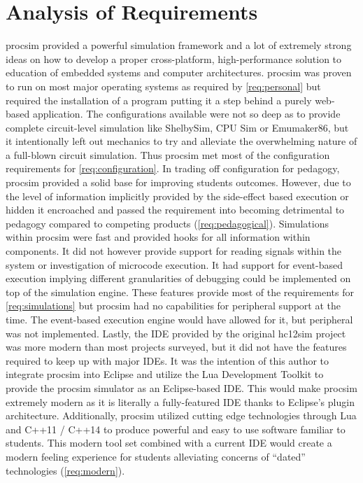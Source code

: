 \section{Analysis of Requirements}

procsim provided a powerful simulation framework and a lot of extremely strong ideas on how to develop a proper cross-platform, high-performance solution to education of embedded systems and computer architectures. procsim  was proven to run on most major operating systems as required by \cref{req:personal} but required the installation of a program putting it a step behind a purely web-based application. The configurations available were not so deep as to provide complete circuit-level simulation like ShelbySim, CPU Sim or Emumaker86, but it intentionally left out mechanics to try and alleviate the overwhelming nature of a full-blown circuit simulation. Thus procsim met most of the configuration requirements for \cref{req:configuration}. In trading off configuration for pedagogy, procsim provided a solid base for improving students outcomes. However, due to the level of information implicitly provided by the side-effect based execution or hidden it encroached and passed the requirement into becoming detrimental to pedagogy compared to competing products (\cref{req:pedagogical}). Simulations within procsim were fast and provided hooks for all information within components. It did not however provide support for reading signals within the system or investigation of microcode execution. It had support for event-based execution implying different granularities of debugging could be implemented on top of the simulation engine. These features provide most of the requirements for \cref{req:simulations} but procsim had no capabilities for peripheral support at the time. The event-based execution engine would have allowed for it, but peripheral was not implemented. Lastly, the IDE provided by the original hc12sim project was more modern than most projects surveyed, but it did not have the features required to keep up with major IDEs. It was the intention of this author to integrate procsim into Eclipse and utilize the Lua Development Toolkit to provide the procsim simulator as an Eclipse-based IDE. This would make procsim extremely modern as it is literally a fully-featured IDE thanks to Eclipse's plugin architecture. Additionally, procsim utilized cutting edge technologies through Lua and C++11 / C++14 to produce powerful and easy to use software familiar to students. This modern tool set combined with a current IDE would create a modern feeling experience for students alleviating concerns of ``dated'' technologies (\cref{req:modern}).

